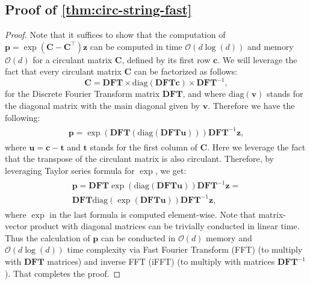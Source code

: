 \subsection{Proof of \cref{thm:circ-string-fast}}
\begin{proof}
Note that it suffices to show that the computation of $\mathbf{p} = \exp(\mathbf{C}-\mathbf{C}^{\top})\mathbf{z}$ can be computed in time $\mathcal{O}(d \log(d))$ and memory $\mathcal{O}(d)$ for a circulant matrix $\mathbf{C}$, defined by its first row $\mathbf{c}$. We will leverage the fact that every circulant matrix $\mathbf{C}$ can be factorized as follows:
\begin{equation}
\mathbf{C} = \mathbf{DFT} \times \mathrm{diag}(\mathbf{DFT}\mathbf{c}) \times \mathbf{DFT}^{-1}, \end{equation}
for the Discrete Fourier Transform matrix $\mathbf{DFT}$, and where $\mathrm{diag}(\mathbf{v})$ stands for the diagonal matrix with the main diagonal given by $\mathbf{v}$.
Therefore we have the following:
\begin{align}
\begin{split}
\mathbf{p} = \exp(\mathbf{DFT}(\mathrm{diag}(\mathbf{DFT}\mathbf{u})))\mathbf{DFT}^{-1}\mathbf{z},    
\end{split}    
\end{align}
where $\mathbf{u} = \mathbf{c}-\mathbf{t}$ and $\mathbf{t}$ stands for the first column of $\mathbf{C}$. Here we leverage the fact that the transpose of the circulant matrix is also circulant. Therefore, by leveraging Taylor series formula for $\exp$, we get:
\begin{align}
\begin{split}
\mathbf{p} = \mathbf{DFT}\exp(\mathrm{diag}(\mathbf{DFT}\mathbf{u}))\mathbf{DFT}^{-1}\mathbf{z} = \\
\mathbf{DFT}\mathrm{diag}(\exp(\mathbf{DFT}\mathbf{u}))\mathbf{DFT}^{-1}\mathbf{z},
\end{split}    
\end{align}
where $\exp$ in the last formula is computed element-wise.
Note that matrix-vector product with diagonal matrices can be trivially conducted in linear time. Thus the calculation of $\mathbf{p}$ can be conducted in $\mathcal{O}(d)$ memory and $\mathcal{O}(d\log(d))$ time complexity via Fast Fourier Transform (FFT) (to multiply with $\mathbf{DFT}$ matrices) and inverse FFT (iFFT) (to multiply with matrices $\mathbf{DFT}^{-1}$). That completes the proof.
\end{proof}




